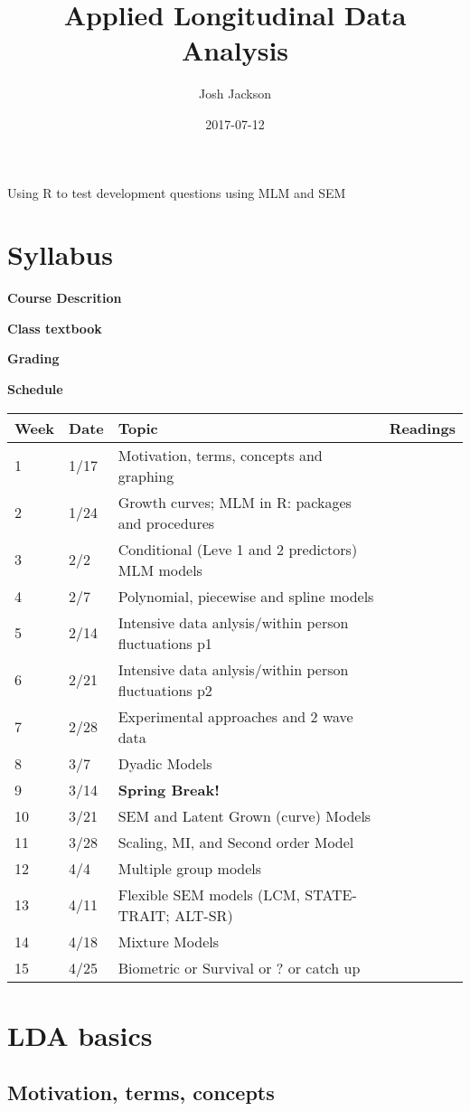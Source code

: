 \documentclass[]{book}
\title{Applied Longitudinal Data Analysis}
\author{Josh Jackson}
\date{2017-07-12}
\begin{document}
\maketitle

{
\setcounter{tocdepth}{1}
\tableofcontents
}
\chapter*{}\label{section}

Using R to test development questions using MLM and SEM

\chapter{Syllabus}\label{syllabus}

\textbf{Course Descrition}

\textbf{Class textbook}

\textbf{Grading}

\textbf{Schedule}

\begin{longtable}[]{@{}llll@{}}
\toprule
Week & Date & Topic & Readings\tabularnewline
\midrule
\endhead
1 & 1/17 & Motivation, terms, concepts and graphing &\tabularnewline
2 & 1/24 & Growth curves; MLM in R: packages and procedures
&\tabularnewline
3 & 2/2 & Conditional (Leve 1 and 2 predictors) MLM models
&\tabularnewline
4 & 2/7 & Polynomial, piecewise and spline models &\tabularnewline
5 & 2/14 & Intensive data anlysis/within person fluctuations p1
&\tabularnewline
6 & 2/21 & Intensive data anlysis/within person fluctuations p2
&\tabularnewline
7 & 2/28 & Experimental approaches and 2 wave data &\tabularnewline
8 & 3/7 & Dyadic Models &\tabularnewline
9 & 3/14 & \textbf{Spring Break!} &\tabularnewline
10 & 3/21 & SEM and Latent Grown (curve) Models &\tabularnewline
11 & 3/28 & Scaling, MI, and Second order Model &\tabularnewline
12 & 4/4 & Multiple group models &\tabularnewline
13 & 4/11 & Flexible SEM models (LCM, STATE-TRAIT; ALT-SR)
&\tabularnewline
14 & 4/18 & Mixture Models &\tabularnewline
15 & 4/25 & Biometric or Survival or ? or catch up &\tabularnewline
\bottomrule
\end{longtable}

\chapter{LDA basics}\label{lda-basics}

\section{Motivation, terms, concepts}\label{motivation-terms-concepts}
\end{document}
